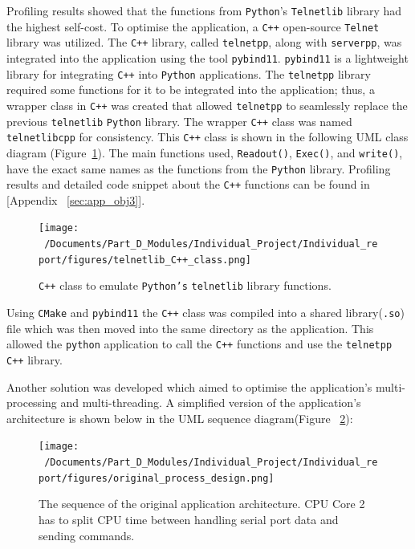 Profiling results showed that the functions from \texttt{Python}'s \texttt{Telnetlib} library had the highest self-cost. To optimise the application, a \texttt{C++} open-source \texttt{Telnet} library was utilized. The \texttt{C++} library, called \texttt{telnetpp},\cite{telnetpp_library} along with \texttt{serverpp},\cite{serverpp_library} was integrated into the application using the tool \texttt{pybind11}. \texttt{pybind11} is a lightweight library for integrating \texttt{C++} into \texttt{Python} applications\cite{pybind11}. The \texttt{telnetpp} library required some functions for it to be integrated into the application; thus, a wrapper class in \texttt{C++} was created that allowed \texttt{telnetpp} to seamlessly replace the previous \texttt{telnetlib} \texttt{Python} library. The wrapper \texttt{C++} class was named \texttt{telnetlibcpp} for consistency. This \texttt{C++} class is shown in the following UML class diagram (Figure~\ref{fig:telnetlibcpp_UML}). The main functions used, \texttt{Readout()}, \texttt{Exec()}, and \texttt{write()}, have the exact same names as the functions from the \texttt{Python} library. Profiling results and detailed code snippet about the \texttt{C++} functions can be found in [Appendix ~\ref{sec:app_obj3}]. 

\begin{figure}[htbp] %
	\centering
	\texttt{[image: ~/Documents/Part\_D\_Modules/Individual\_Project/Individual\_report/figures/telnetlib\_C++\_class.png]} %
	\caption{\texttt{C++} class to emulate \texttt{Python's} \texttt{telnetlib} library functions.}
	\label{fig:telnetlibcpp_UML} %
\end{figure}

Using \texttt{CMake} and \texttt{pybind11} the \texttt{C++} class was compiled into a shared library(\texttt{.so}) file which was then moved into the same directory as the application. This allowed the \texttt{python} application to call the \texttt{C++} functions and use the \texttt{telnetpp} \texttt{C++} library. 

Another solution was developed which aimed to optimise the application's multi-processing and multi-threading. A simplified version of the application's architecture is shown below in the UML sequence diagram(Figure ~\ref{fig:original_application_arch}):

\begin{figure}[htbp] %
	\centering
	\texttt{[image: ~/Documents/Part\_D\_Modules/Individual\_Project/Individual\_report/figures/original\_process\_design.png]} %
	\caption{The sequence of the original application architecture. CPU Core 2 has to split CPU time between handling serial port data and sending commands.}
	\label{fig:original_application_arch} %
\end{figure}

